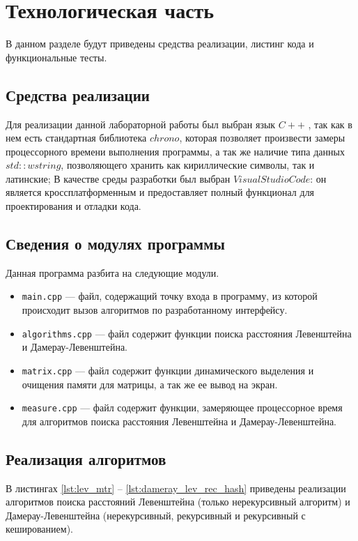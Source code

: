 \chapter{Технологическая часть}

В данном разделе будут приведены средства реализации, листинг кода и функциональные тесты.

\section{Средства реализации}

Для реализации данной лабораторной работы был выбран язык $C++$ \cite{cpp-lang}, так как в нем есть стандартная библиотека $chrono$, которая позволяет произвести замеры процессорного времени выполнения программы, а так же наличие типа данных $std::wstring$, позволяющего хранить как кириллические символы, так и латинские;
В качестве среды разработки был выбран $Visual Studio Code$: он является кроссплатформенным и предоставляет полный функционал для проектирования и отладки кода.
 
\section{Сведения о модулях программы}

Данная программа разбита на следующие модули.

\begin{itemize}
	\item \texttt{main.cpp} --- файл, содержащий точку входа в программу, из которой происходит вызов алгоритмов по разработанному интерфейсу.
	\item \texttt{algorithms.cpp} --- файл содержит функции поиска расстояния Левенштейна и Дамерау-Левенштейна.
	\item \texttt{matrix.cpp} --- файл содержит функции динамического выделения и очищения памяти для матрицы, а так же ее вывод на экран.
	\item \texttt{measure.cpp} --- файл содержит функции, замеряющее процессорное время для алгоритмов поиска расстояния Левенштейна и Дамерау-Левенштейна.
\end{itemize}

\section{Реализация алгоритмов}

В листингах \ref{lst:lev_mtr} -- \ref{lst:dameray_lev_rec_hash} приведены реализации алгоритмов поиска расстояний Левенштейна (только нерекурсивный алгоритм) и \break Дамерау-Левенштейна (нерекурсивный, рекурсивный и рекурсивный с кешированием).

